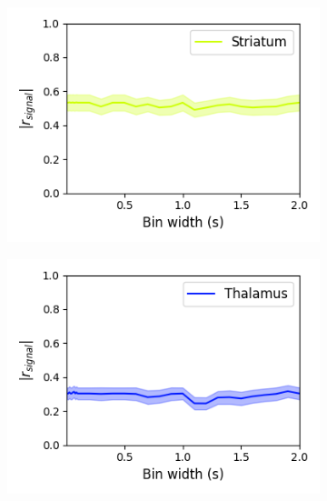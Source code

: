 \documentclass[a4paper,12pt]{article}
\theoremstyle{definition}
\begin{document}
\begin{figure}[p]
\begin{subfigure}{0.5\textwidth}
    \includegraphics[width=\textwidth]{figures/signal_linear_bin_width_correlations_striatum_0.png}
  \end{subfigure}
  \begin{subfigure}{0.5\textwidth}
    \centering
    \includegraphics[width=\textwidth]{figures/signal_linear_bin_width_correlations_thalamus_0.png}
  \end{subfigure}
  \begin{subfigure}{0.5\textwidth}
    \centering

\end{subfigure}
\end{figure}
\end{document}
